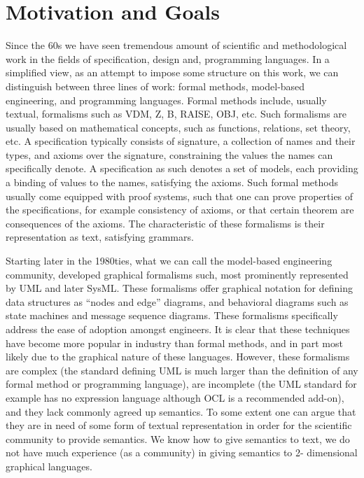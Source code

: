 
\section{Motivation and Goals}
\label{sec:introduction}

Since the 60s we have seen tremendous amount of scientific and 
methodological work in the fields of specification, design and, 
programming languages. In a simplified view, as an attempt to 
impose some structure on this work, we can distinguish between 
three lines of work: formal methods, model-based engineering, and 
programming languages. Formal methods include, usually textual, 
formalisms such as VDM, Z, B, RAISE, OBJ, etc. Such formalisms are 
usually based on mathematical concepts, such as functions, 
relations, set theory, etc. A specification typically consists of
signature, a collection of names and their types, and axioms over 
the signature, constraining the values the names can specifically 
denote. A specification as such denotes a set of models, each 
providing a binding of values to the names, satisfying the axioms.
Such formal methods usually come equipped with proof systems, such 
that one can prove properties of the specifications, for example 
consistency of axioms, or that certain theorem are consequences of 
the axioms. The characteristic of these formalisms is their 
representation as text, satisfying grammars.

Starting later in the 1980ties, what we can call the model-based 
engineering community, developed graphical formalisms such, most 
prominently represented by UML and later SysML. These formalisms 
offer graphical notation for defining data structures as ``nodes 
and edge'' diagrams, and behavioral diagrams such as state machines 
and message sequence diagrams. These formalisms specifically 
address the ease of adoption amongst engineers. It is clear that
these techniques have become more popular in industry than formal 
methods, and in part most likely due to the graphical nature of 
these languages. However, these formalisms are complex (the 
standard defining UML is much larger than the definition of any 
formal method or programming language), are incomplete (the UML
standard for example has no expression language although OCL is
a recommended add-on), and they lack commonly agreed up semantics. 
To some extent one can argue that they are in need of some form of 
textual representation in order for the scientific community to 
provide semantics. We know how to give semantics to text, we do not 
have much experience (as a community) in giving semantics to 2-
dimensional graphical languages.

